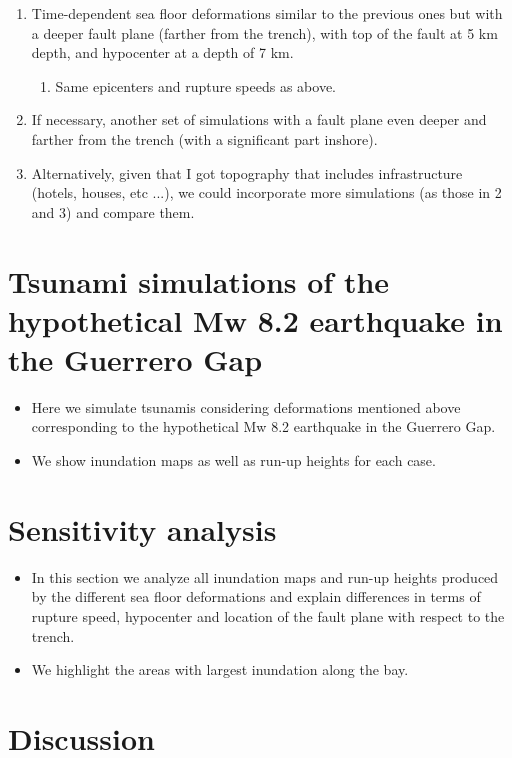 \documentclass[preprint,review,12pt]{elsarticle}
\begin{document}
\begin{enumerate}
  \item Time-dependent sea floor deformations similar to the previous ones but with a deeper fault plane (farther from the trench), with top of the fault at 5 km depth, and hypocenter at a depth of 7 km.

  \begin{enumerate}
   \item Same epicenters and rupture speeds as above.
  \end{enumerate}

   \item If necessary, another set of simulations with a fault plane even deeper and farther from the trench (with a significant part inshore). 

  \item Alternatively, given that I got topography that includes infrastructure (hotels, houses, etc ...), we could incorporate more simulations (as those in 2 and 3) and compare them.
\end{enumerate}

\section{Tsunami simulations of the hypothetical Mw 8.2 earthquake in the Guerrero Gap}
\begin{itemize}
  \item Here we simulate tsunamis considering deformations mentioned above corresponding to the  hypothetical Mw 8.2 earthquake in the Guerrero Gap. 
  \item We show inundation maps as well as run-up heights for each case.
\end{itemize}

\section{Sensitivity analysis}

\begin{itemize}
  \item  In this section we analyze all inundation maps and run-up heights produced by the different sea floor deformations and explain differences in terms of rupture speed, hypocenter and location of the fault plane with respect to the trench. 
 \item We highlight the areas with largest inundation along the bay.
\end{itemize}

\section{Discussion}
\end{document}
